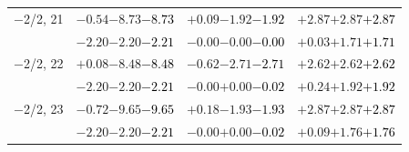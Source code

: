 \documentclass[compress]{beamer}
\begin{document}
\begin{frame}
\begin{tabular}{r | c | c | c}
$-$2/2, 21 & $-0.54$\hspace{0.1 cm}$-8.73$\hspace{0.1 cm}\textcolor{black}{$-8.73$} & $+0.09$\hspace{0.1 cm}$-1.92$\hspace{0.1 cm}\textcolor{black}{$-1.92$} & $+2.87$\hspace{0.1 cm}$+2.87$\hspace{0.1 cm}\textcolor{black}{$+2.87$} \\
           & $-2.20$\hspace{0.1 cm}$-2.20$\hspace{0.1 cm}\textcolor{black}{$-2.21$} & $-0.00$\hspace{0.1 cm}$-0.00$\hspace{0.1 cm}\textcolor{black}{$-0.00$} & $+0.03$\hspace{0.1 cm}$+1.71$\hspace{0.1 cm}\textcolor{black}{$+1.71$} \\
$-$2/2, 22 & $+0.08$\hspace{0.1 cm}$-8.48$\hspace{0.1 cm}\textcolor{black}{$-8.48$} & $-0.62$\hspace{0.1 cm}$-2.71$\hspace{0.1 cm}\textcolor{black}{$-2.71$} & $+2.62$\hspace{0.1 cm}$+2.62$\hspace{0.1 cm}\textcolor{black}{$+2.62$} \\
           & $-2.20$\hspace{0.1 cm}$-2.20$\hspace{0.1 cm}\textcolor{black}{$-2.21$} & $-0.00$\hspace{0.1 cm}$+0.00$\hspace{0.1 cm}\textcolor{black}{$-0.02$} & $+0.24$\hspace{0.1 cm}$+1.92$\hspace{0.1 cm}\textcolor{black}{$+1.92$} \\
$-$2/2, 23 & $-0.72$\hspace{0.1 cm}$-9.65$\hspace{0.1 cm}\textcolor{black}{$-9.65$} & $+0.18$\hspace{0.1 cm}$-1.93$\hspace{0.1 cm}\textcolor{black}{$-1.93$} & $+2.87$\hspace{0.1 cm}$+2.87$\hspace{0.1 cm}\textcolor{black}{$+2.87$} \\
           & $-2.20$\hspace{0.1 cm}$-2.20$\hspace{0.1 cm}\textcolor{black}{$-2.21$} & $-0.00$\hspace{0.1 cm}$+0.00$\hspace{0.1 cm}\textcolor{black}{$-0.02$} & $+0.09$\hspace{0.1 cm}$+1.76$\hspace{0.1 cm}\textcolor{black}{$+1.76$} \\

\end{tabular}
\end{frame}
\end{document}
